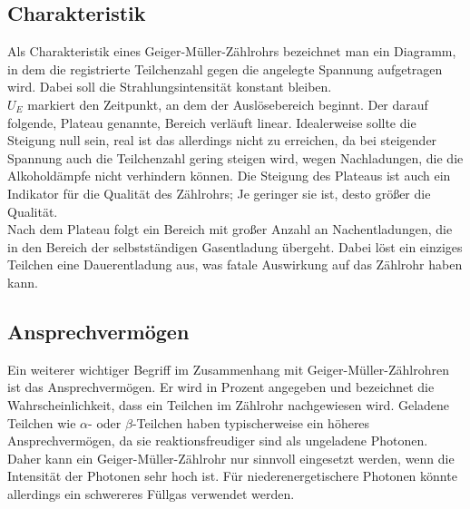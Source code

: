 \subsection{Charakteristik}
Als Charakteristik eines Geiger-Müller-Zählrohrs bezeichnet man ein Diagramm,
in dem die registrierte Teilchenzahl gegen die angelegte Spannung aufgetragen wird.
Dabei soll die Strahlungsintensität konstant bleiben.\\
$U_E$ markiert den Zeitpunkt, an dem der Auslösebereich beginnt. Der darauf
folgende, Plateau genannte, Bereich verläuft linear. Idealerweise sollte die 
Steigung null sein, real ist das allerdings nicht zu erreichen, da bei steigender
Spannung auch die Teilchenzahl gering steigen wird, wegen Nachladungen, die
die Alkoholdämpfe nicht verhindern können. Die Steigung des Plateaus ist auch ein
Indikator für die Qualität des Zählrohrs; Je geringer sie ist, desto größer
die Qualität.\\
Nach dem Plateau folgt ein Bereich mit großer Anzahl an Nachentladungen, die in den
Bereich der selbstständigen Gasentladung übergeht. Dabei löst ein einziges Teilchen 
eine Dauerentladung aus, was fatale Auswirkung auf das Zählrohr haben kann.\\

\subsection{Ansprechvermögen}
Ein weiterer wichtiger Begriff im Zusammenhang mit Geiger-Müller-Zählrohren 
ist das Ansprechvermögen.
Er wird in Prozent angegeben und bezeichnet die Wahrscheinlichkeit, dass ein Teilchen im Zählrohr nachgewiesen
wird. Geladene Teilchen wie $\alpha$- oder $\beta$-Teilchen haben typischerweise ein höheres Ansprechvermögen, 
da sie reaktionsfreudiger sind als ungeladene Photonen. Daher kann ein
Geiger-Müller-Zählrohr nur sinnvoll eingesetzt werden, wenn die Intensität
der Photonen sehr hoch ist. Für niederenergetischere Photonen könnte allerdings
ein schwereres Füllgas verwendet werden.

